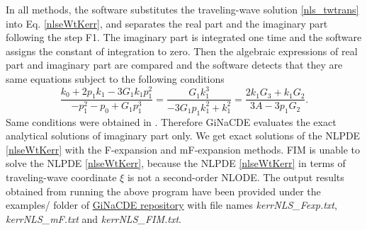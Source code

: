 \documentclass[prd,aps,floats,showkeys,nofootinbib,notitlepage]{revtex4-2}
\begin{document}
	
	In all methods, the software substitutes the traveling-wave solution \eqref{nls_twtrans} into Eq. \eqref{nlseWtKerr}, and separates the real part and the imaginary part following the step F1. The imaginary part is integrated one time and the software assigns the constant of integration to zero. Then the algebraic expressions of real part and imaginary part are compared and the software detects that they are same equations subject to the following conditions
	\begin{equation}\label{nlseWtKerrCond}
		\frac{{{k_0} + 2{p_1}{k_1} - 3{G_1}{k_1}p_1^2}}{{ - p_1^2 - {p_0} + {G_1}p_1^3}} = \frac{{{G_1}k_1^3}}{{ - 3{G_1}{p_1}k_1^2 + k_1^2}} = \frac{{2{k_1}{G_3} + {k_1}{G_2}}}{{3A - 3{p_1}{G_2}}}.
	\end{equation}
	Same conditions were obtained in \cite{complexTwt1}. Therefore GiNaCDE evaluates the exact analytical solutions of imaginary part only. 
	We get exact solutions of the NLPDE \eqref{nlseWtKerr} with the F-expansion and mF-expansion methods. FIM is unable to solve the NLPDE \eqref{nlseWtKerr}, because the NLPDE \eqref{nlseWtKerr} in terms of traveling-wave coordinate $\xi$ is not a second-order NLODE. The output results obtained from running the above program have been provided under the examples/ folder of \href{https://github.com/mithun218/GiNaCDE}{GiNaCDE repository} with file names \textit{kerrNLS\_Fexp.txt}, \textit{kerrNLS\_mF.txt} and \textit{kerrNLS\_FIM.txt}.  
	
	
\end{document}
